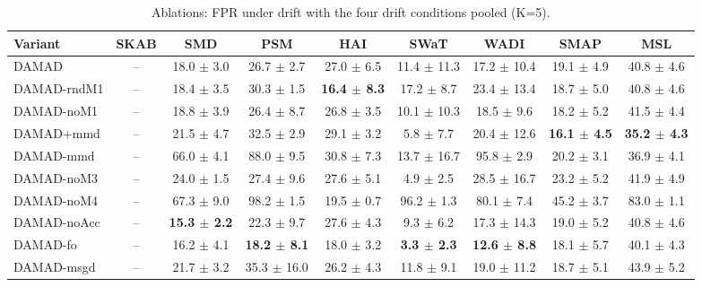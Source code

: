 \begin{table}[t]
\centering
\small
\caption{Ablations: FPR under drift with the four drift conditions pooled (K=5).}
\label{tab:abl_fpr_drift}
\begin{tabular}{lcccccccc}
\toprule
Variant & SKAB & SMD & PSM & HAI & SWaT & WADI & SMAP & MSL \\
\midrule
DAMAD & – & 18.0 $\pm$ 3.0 & 26.7 $\pm$ 2.7 & 27.0 $\pm$ 6.5 & 11.4 $\pm$ 11.3 & 17.2 $\pm$ 10.4 & 19.1 $\pm$ 4.9 & 40.8 $\pm$ 4.6 \\
DAMAD-rndM1 & – & 18.4 $\pm$ 3.5 & 30.3 $\pm$ 1.5 & \textbf{16.4 $\pm$ 8.3} & 17.2 $\pm$ 8.7 & 23.4 $\pm$ 13.4 & 18.7 $\pm$ 5.0 & 40.8 $\pm$ 4.6 \\
DAMAD-noM1 & – & 18.8 $\pm$ 3.9 & 26.4 $\pm$ 8.7 & 26.8 $\pm$ 3.5 & 10.1 $\pm$ 10.3 & 18.5 $\pm$ 9.6 & 18.2 $\pm$ 5.2 & 41.5 $\pm$ 4.4 \\
DAMAD+mmd & – & 21.5 $\pm$ 4.7 & 32.5 $\pm$ 2.9 & 29.1 $\pm$ 3.2 & 5.8 $\pm$ 7.7 & 20.4 $\pm$ 12.6 & \textbf{16.1 $\pm$ 4.5} & \textbf{35.2 $\pm$ 4.3} \\
DAMAD-mmd & – & 66.0 $\pm$ 4.1 & 88.0 $\pm$ 9.5 & 30.8 $\pm$ 7.3 & 13.7 $\pm$ 16.7 & 95.8 $\pm$ 2.9 & 20.2 $\pm$ 3.1 & 36.9 $\pm$ 4.1 \\
DAMAD-noM3 & – & 24.0 $\pm$ 1.5 & 27.4 $\pm$ 9.6 & 27.6 $\pm$ 5.1 & 4.9 $\pm$ 2.5 & 28.5 $\pm$ 16.7 & 23.2 $\pm$ 5.2 & 41.9 $\pm$ 4.9 \\
DAMAD-noM4 & – & 67.3 $\pm$ 9.0 & 98.2 $\pm$ 1.5 & 19.5 $\pm$ 0.7 & 96.2 $\pm$ 1.3 & 80.1 $\pm$ 7.4 & 45.2 $\pm$ 3.7 & 83.0 $\pm$ 1.1 \\
DAMAD-noAcc & – & \textbf{15.3 $\pm$ 2.2} & 22.3 $\pm$ 9.7 & 27.6 $\pm$ 4.3 & 9.3 $\pm$ 6.2 & 17.3 $\pm$ 14.3 & 19.0 $\pm$ 5.2 & 40.8 $\pm$ 4.6 \\
DAMAD-fo & – & 16.2 $\pm$ 4.1 & \textbf{18.2 $\pm$ 8.1} & 18.0 $\pm$ 3.2 & \textbf{3.3 $\pm$ 2.3} & \textbf{12.6 $\pm$ 8.8} & 18.1 $\pm$ 5.7 & 40.1 $\pm$ 4.3 \\
DAMAD-msgd & – & 21.7 $\pm$ 3.2 & 35.3 $\pm$ 16.0 & 26.2 $\pm$ 4.3 & 11.8 $\pm$ 9.1 & 19.0 $\pm$ 11.2 & 18.7 $\pm$ 5.1 & 43.9 $\pm$ 5.2 \\
\bottomrule
\end{tabular}
\end{table}

